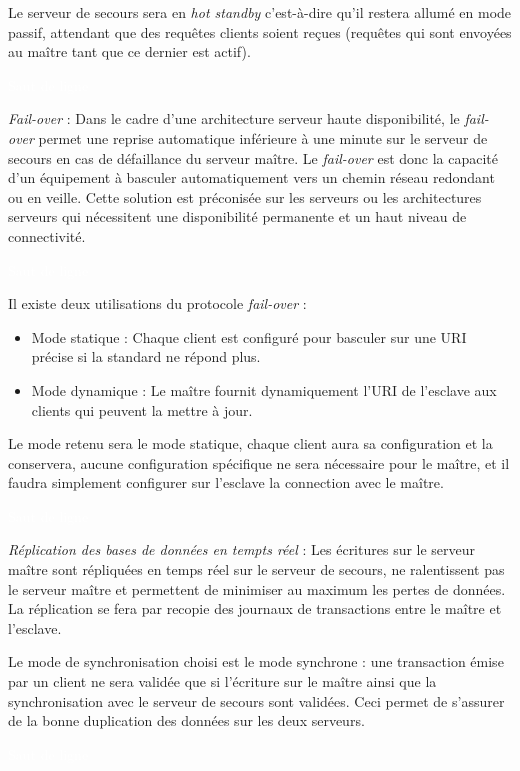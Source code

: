 Le serveur de secours sera en \textit{hot standby} c'est-à-dire qu'il restera allumé en mode passif, attendant que des requêtes clients soient reçues (requêtes qui sont envoyées au maître tant que ce dernier est actif).

\textcolor{white}{Saut de ligne}

\textit{Fail-over} : Dans le cadre d'une architecture serveur haute disponibilité, le \textit{fail-over} permet une reprise automatique inférieure à une minute sur le serveur de secours en cas de défaillance du serveur maître. Le \textit{fail-over} est donc la capacité d'un équipement à basculer automatiquement vers un chemin réseau redondant ou en veille. Cette solution est préconisée sur les serveurs ou les architectures serveurs qui nécessitent une disponibilité permanente et un haut niveau de connectivité.

\textcolor{white}{Saut de ligne}

Il existe deux utilisations du protocole \textit{fail-over} :
\begin{itemize}
\item Mode statique : Chaque client est configuré pour basculer sur une URI précise si la standard ne répond plus.
\item Mode dynamique : Le maître fournit dynamiquement l'URI de l'esclave aux clients qui peuvent la mettre à jour.
\end{itemize}
Le mode retenu sera le mode statique, chaque client aura sa configuration et la conservera, aucune configuration spécifique ne sera nécessaire pour le maître, et il faudra simplement configurer sur l'esclave la connection avec le maître.

\textcolor{white}{Saut de ligne}

\textit{Réplication des bases de données en tempts réel} : 
Les écritures sur le serveur maître sont répliquées en temps réel sur le serveur de secours, ne ralentissent pas le serveur maître et permettent de minimiser au maximum les pertes de données. La réplication se fera par recopie des journaux de transactions entre le maître et l'esclave.

Le mode de synchronisation choisi est le mode synchrone : une transaction émise par un client ne sera validée que si l'écriture sur le maître ainsi que la synchronisation avec le serveur de secours sont validées. Ceci permet de s'assurer de la bonne duplication des données sur les deux serveurs. 

\textcolor{white}{Saut de ligne}

